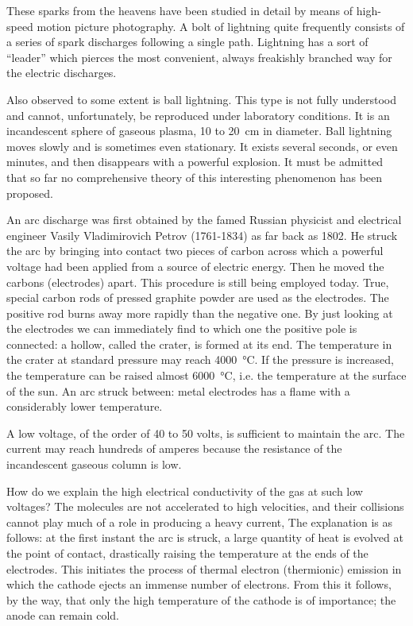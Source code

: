 These sparks from the heavens have been studied in detail by means of high-speed motion picture photography. A bolt of lightning quite frequently consists of a series of spark discharges following a single path. Lightning has a sort of ``leader'' which pierces the most convenient, always freakishly branched way for the electric discharges.

Also observed to some extent is ball lightning. This type is not fully understood and cannot, unfortunately, be reproduced under laboratory conditions. It is an incandescent sphere of gaseous plasma, 10 to \SI{20}{\centi\meter} in diameter. Ball lightning moves slowly and is sometimes even stationary. It exists several seconds, or even minutes, and then disappears with a powerful explosion. It must be admitted that so far no comprehensive theory of this interesting phenomenon has been proposed.

\noindent{} An arc discharge was first obtained by the famed Russian physicist and electrical engineer Vasily Vladimirovich Petrov (1761-1834) as far back as 1802. He struck the arc by bringing into contact two pieces of carbon across which a powerful voltage had been applied from a source of electric energy. Then he moved the carbons (electrodes) apart. This procedure is still being employed today. True, special carbon rods of pressed graphite powder are used as the electrodes. The positive rod burns away more rapidly than the negative
one. By just looking at the electrodes we can immediately find to which one the positive pole is connected: a hollow, called the crater, is formed at its end. The temperature in the crater at standard pressure may reach \SI{4000}{\celsius}. If the pressure is increased, the temperature can be raised almost \SI{6000}{\celsius}, i.e. the temperature at the surface of the sun. An arc struck between: metal electrodes has a flame with a considerably lower temperature.

A low voltage, of the order of 40 to 50 volts, is sufficient to maintain the arc. The current may reach hundreds of amperes because the resistance of the incandescent gaseous column is low.

How do we explain the high electrical conductivity of the gas at such low voltages? The molecules are not accelerated to high velocities, and their collisions cannot play much of a role in producing a heavy current, The explanation is as follows: at the first instant the arc is struck, a large quantity of heat is evolved at the point of contact, drastically raising the temperature at the ends of the electrodes. This initiates the process of thermal electron (thermionic) emission in which the cathode ejects an immense number of electrons. From this it follows, by the way, that only the high temperature of the cathode is of importance; the anode can remain cold.

